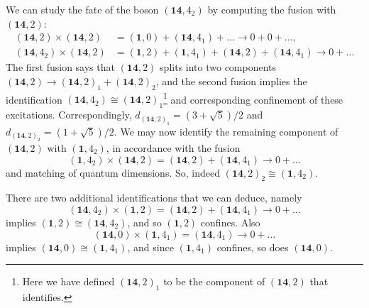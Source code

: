 \documentclass[11pt]{article}
\numberwithin{equation}{section}
\begin{document}
We can study the fate of the boson $(\mathbf{14},4_{2})$ by computing the fusion with $(\mathbf{14},2)$:
\begin{align}
    (\mathbf{14},2) \times (\mathbf{14},2) &= (\mathbf{1},0) + (\mathbf{14},4_{1}) + \ldots \longrightarrow 0 + 0 + \ldots, \\[0.3cm]
    (\mathbf{14},4_{2}) \times (\mathbf{14},2) &= (\mathbf{1}, 2) + (\mathbf{1}, 4_{1}) + (\mathbf{14}, 2) + (\mathbf{14}, 4_{1}) \longrightarrow 0 + \ldots
\end{align}
The first fusion says that $(\mathbf{14},2)$ splits into two components $(\mathbf{14},2) \to (\mathbf{14},2)_{1} +  (\mathbf{14},2)_{2}$, and the second fusion implies the identification $(\mathbf{14},4_{2}) \cong (\mathbf{14},2)_{1}$\footnote{Here we have defined $(\mathbf{14},2)_{1}$ to be the component of $(\mathbf{14},2)$ that identifies.} and corresponding confinement of these excitations. Correspondingly, $d_{(\mathbf{14},2)_{1}} = (3 + \sqrt{5})/2$ and $d_{(\mathbf{14},2)_{2}} = (1 + \sqrt{5})/2$. We may now identify the remaining component of $(\mathbf{14},2)$ with $(\mathbf{1},4_{2})$, in accordance with the fusion
\begin{equation}
    (\mathbf{1}, 4_{2}) \times (\mathbf{14}, 2) = (\mathbf{14}, 2) +  (\mathbf{14}, 4_{1}) \longrightarrow 0 + \ldots
\end{equation}
and matching of quantum dimensions. So, indeed $(\mathbf{14},2)_{2} \cong (\mathbf{1},4_{2})$.

There are two additional identifications that we can deduce, namely
\begin{equation}
     (\mathbf{14},4_{2}) \times (\mathbf{1},2) = (\mathbf{14}, 2) + (\mathbf{14},4_{1}) \longrightarrow 0 + \ldots
\end{equation}
implies $(\mathbf{1},2) \cong (\mathbf{14},4_{2})$, and so $(\mathbf{1},2)$ confines. Also
\begin{equation}
    (\mathbf{14},0) \times (\mathbf{1},4_{1}) = (\mathbf{14},4_{1}) \longrightarrow 0 + \ldots
\end{equation}
implies $(\mathbf{14},0) \cong (\mathbf{1},4_{1})$, and since $(\mathbf{1},4_{1})$ confines, so does $(\mathbf{14},0)$.
\end{document}
